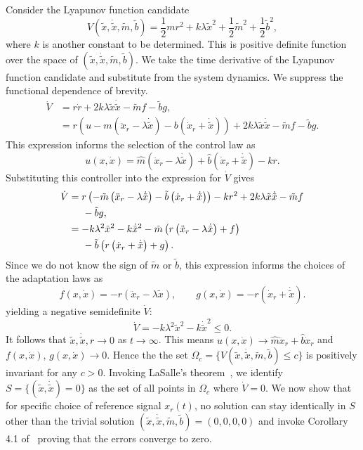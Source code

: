 Consider the Lyapunov function candidate
%
\begin{equation}
    V(\tilde{x}, \dot{\tilde{x}}, \tilde{m}, \tilde{b}) = \frac{1}{2}mr^2 + 
    k\lambda\tilde{x}^2 + \frac{1}{2}\tilde{m}^2 + \frac{1}{2}\tilde{b}^2,
    \label{eq:lyap_cand}
\end{equation}
%
where $k$ is another constant to be determined. This is positive definite
function over the space of $(\tilde{x}, \dot{\tilde{x}}, \tilde{m}, \tilde{b})$.
We take the time derivative of the Lyapunov function candidate and substitute
from the system dynamics. We suppress the functional dependence of brevity.
%
\begin{align*}
    \dot{V} &= r\dot{r} + 2k\lambda\tilde{x}\dot{\tilde{x}} - \tilde{m}f -
    \tilde{b}g, \\
    &= r\left(u - m\left(\ddot{x}_r - \lambda\dot{\tilde{x}}\right)
    -b\left(\dot{x}_r + \dot{\tilde{x}} \right)\right) +
    2k\lambda\tilde{x}\dot{\tilde{x}} - \tilde{m}f - \tilde{b}g.
\end{align*}
%
This expression informs the selection of the control law as \[ \boxed{u(x, 
\dot{x}) = \hat{m}\left(\ddot{x}_r - \lambda\dot{\tilde{x}}\right) +
\hat{b}\left(\dot{x}_r + \dot{\tilde{x}}\right) - kr}. \] Substituting this
controller into the expression for $\dot{V}$ gives
%
\begin{align*}
    \dot{V} &= r\left(-\tilde{m}\left(\ddot{x}_r - \lambda\dot{\tilde{x}}\right) 
    - \tilde{b}\left(\dot{x}_r+\dot{\tilde{x}}\right)\right) - kr^2 + 
    2k\lambda\tilde{x}\dot{\tilde{x}} -\tilde{m}f\\ 
    &{\hspace{5mm}} - \tilde{b}g, \\
    &= -k\lambda^2\tilde{x}^2 - k\dot{\tilde{x}}^2 -
    \tilde{m}\left(r\left(\ddot{x}_r - \lambda\dot{\tilde{x}}\right) + f\right)
    \\
    &{\hspace{5mm}}-\tilde{b}\left(r\left(\dot{x}_r +
    \dot{\tilde{x}}\right)+g\right).
\end{align*}
%
Since we do not know the sign of $\tilde{m}$ or $\tilde{b}$, this expression
informs the choices of the adaptation laws as
\[\boxed{f(x, \dot{x}) = -r\left(\ddot{x}_r - \lambda \tilde{x}\right)}, \qquad 
\boxed{g(x, \dot{x}) = -r\left( \dot{x}_r + \dot{\tilde{x}} \right)}. \] yielding a
negative semidefinite $\dot{V}$:
\[\dot{V} = -k\lambda^2\tilde{x}^2 - k\dot{\tilde{x}}^2 \leq 0. \]
%
It follows that $\tilde{x}, \dot{\tilde{x}}, r \rightarrow 0$ as $t \rightarrow
\infty$. This means $u(x, \dot{x}) \rightarrow \hat{m}\ddot{x}_r +
\hat{b}\dot{x}_r$ and $f(x, \dot{x})$, $g(x, \dot{x}) \rightarrow 0$. Hence the
the set $\Omega_c = \{V(\tilde{x}, \dot{\tilde{x}}, \tilde{m}, \tilde{b}) \leq c 
\}$ is positively invariant for any $c > 0$. Invoking LaSalle's
theorem~\cite{khalil2015nonlinear}, we identify $S = \{(\tilde{x},
\dot{\tilde{x}}) = 0\}$ as the set of all points in $\Omega_c$ where $\dot{V} =
0$. We now show that for specific choice of reference signal $x_r(t)$, no
solution can stay identically in $S$ other than the trivial solution
$(\tilde{x}, \dot{\tilde{x}}, \tilde{m}, \tilde{b}) = (0,0,0,0)$ and invoke
Corollary 4.1 of~\cite{khalil2015nonlinear} proving that the errors converge to
zero.

